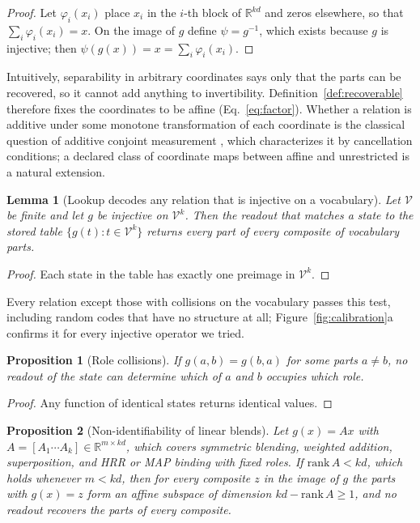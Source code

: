 \documentclass[10pt]{article}
\theoremstyle{plain}
\newtheorem{proposition}{Proposition}
\newtheorem{lemma}{Lemma}
\theoremstyle{remark}
\newcommand{\R}{\mathbb{R}}
\newcommand{\Voc}{\mathcal{V}}
\begin{document}
\begin{proof}
Let $\varphi_i(x_i)$ place $x_i$ in the $i$-th block of $\R^{kd}$ and zeros elsewhere, so that $\sum_i \varphi_i(x_i) = x$. On the image of $g$ define $\psi = g^{-1}$, which exists because $g$ is injective; then $\psi(g(x)) = x = \sum_i \varphi_i(x_i)$.
\end{proof}

\noindent
Intuitively, separability in arbitrary coordinates says only that the parts can be recovered, so it cannot add anything to invertibility. Definition~\ref{def:recoverable} therefore fixes the coordinates to be affine (Eq.~\ref{eq:factor}). Whether a relation is additive under some monotone transformation of each coordinate is the classical question of additive conjoint measurement \citep{luce1964}, which characterizes it by cancellation conditions; a declared class of coordinate maps between affine and unrestricted is a natural extension.

\begin{lemma}[Lookup decodes any relation that is injective on a vocabulary]
\label{lem:lookup}
Let $\Voc$ be finite and let $g$ be injective on $\Voc^k$. Then the readout that matches a state to the stored table $\{g(t) : t \in \Voc^k\}$ returns every part of every composite of vocabulary parts.
\end{lemma}

\begin{proof}
Each state in the table has exactly one preimage in $\Voc^k$.
\end{proof}

\noindent
Every relation except those with collisions on the vocabulary passes this test, including random codes that have no structure at all; Figure~\ref{fig:calibration}a confirms it for every injective operator we tried.

\begin{proposition}[Role collisions]
\label{prop:blend}
If $g(a, b) = g(b, a)$ for some parts $a \neq b$, no readout of the state can determine which of $a$ and $b$ occupies which role.
\end{proposition}

\begin{proof}
Any function of identical states returns identical values.
\end{proof}

\begin{proposition}[Non-identifiability of linear blends]
\label{prop:fiber}
Let $g(x) = Ax$ with $A = [A_1 \cdots A_k] \in \R^{m \times kd}$, which covers symmetric blending, weighted addition, superposition, and HRR or MAP binding with fixed roles. If $\mathrm{rank}\,A < kd$, which holds whenever $m < kd$, then for every composite $z$ in the image of $g$ the parts with $g(x) = z$ form an affine subspace of dimension $kd - \mathrm{rank}\,A \geq 1$, and no readout recovers the parts of every composite.
\end{proposition}
\end{document}
